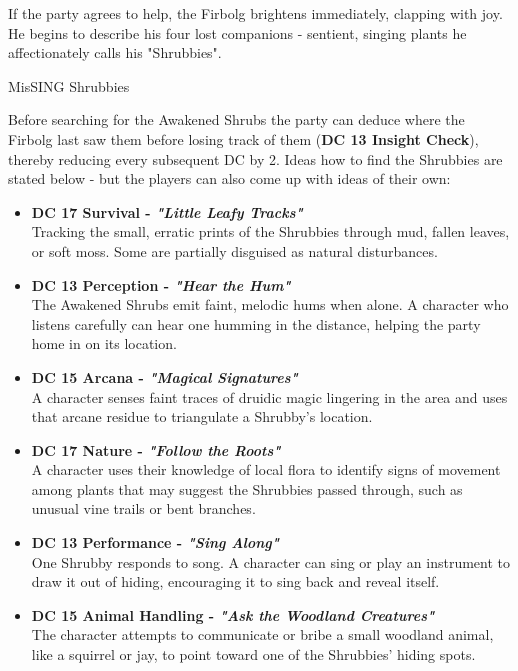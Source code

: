 {\noindent\entryfont If the party agrees to help, the Firbolg brightens immediately, clapping with joy. He begins to describe his four lost companions - sentient, singing plants he affectionately calls his "Shrubbies".}

\begin{DndQuestHook}[width=0.5\textwidth - 4pt]{{\large Mis}SING Shrubbies}
	\DndQuestHookBasics[
		location = {Way of Tay, South of Dundee},
		quest-giver = {Firbolg},
		objective = {Find the 4 Awakened Shrubs in the woods.},
	]
	
	{%
		\noindent\entryfont Before searching for the Awakened Shrubs the party can deduce where the Firbolg last saw them before losing track of them (\textbf{DC 13 Insight Check}), thereby reducing every subsequent DC by 2. Ideas how to find the Shrubbies are stated below - but the players can also come up with ideas of their own:
		\begin{itemize}
			\renewcommand\labelitemi{\textbf{\textbullet}}
			\item \textbf{DC 17 Survival - \textit{"Little Leafy Tracks"}}\\Tracking the small, erratic prints of the Shrubbies through mud, fallen leaves, or soft moss. Some are partially disguised as natural disturbances.
			\item \textbf{DC 13 Perception - \textit{"Hear the Hum"}}\\The Awakened Shrubs emit faint, melodic hums when alone. A character who listens carefully can hear one humming in the distance, helping the party home in on its location.
			\item \textbf{DC 15 Arcana - \textit{"Magical Signatures"}}\\A character senses faint traces of druidic magic lingering in the area and uses that arcane residue to triangulate a Shrubby's location.
			\item \textbf{DC 17 Nature - \textit{"Follow the Roots"}}\\A character uses their knowledge of local flora to identify signs of movement among plants that may suggest the Shrubbies passed through, such as unusual vine trails or bent branches.
			\item \textbf{DC 13 Performance - \textit{"Sing Along"}}\\One Shrubby responds to song. A character can sing or play an instrument to draw it out of hiding, encouraging it to sing back and reveal itself.
			\item \textbf{DC 15 Animal Handling - \textit{"Ask the Woodland Creatures"}}\\The character attempts to communicate or bribe a small woodland animal, like a squirrel or jay, to point toward one of the Shrubbies' hiding spots.
		\end{itemize}
	}%
	

\end{DndQuestHook}
